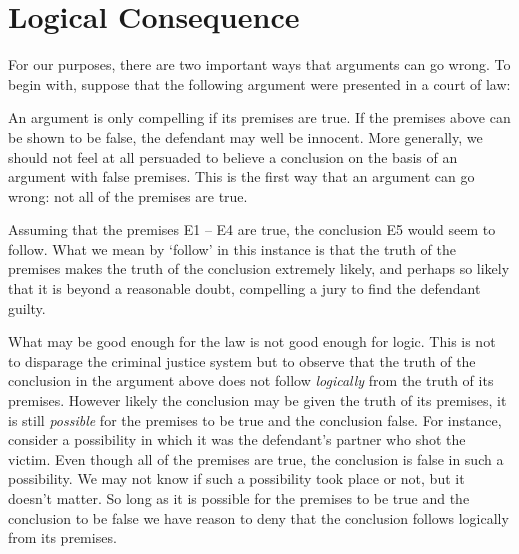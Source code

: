 




\section{Logical Consequence}
  \label{sec:LogicalConsequence}

For our purposes, there are two important ways that arguments can go wrong.
To begin with, suppose that the following argument were presented in a court of law:

\begin{earg}
\end{earg}

An argument is only compelling if its premises are true.
If the premises above can be shown to be false, the defendant may well be innocent.
More generally, we should not feel at all persuaded to believe a conclusion on the basis of an argument with false premises. 
This is the first way that an argument can go wrong: not all of the premises are true.

Assuming that the premises E1 -- E4 are true, the conclusion E5 would seem to follow.
What we mean by `follow' in this instance is that the truth of the premises makes the truth of the conclusion extremely likely, and perhaps so likely that it is beyond a reasonable doubt, compelling a jury to find the defendant guilty.

What may be good enough for the law is not good enough for logic.
This is not to disparage the criminal justice system but to observe that the truth of the conclusion in the argument above does not follow \textit{logically} from the truth of its premises.
However likely the conclusion may be given the truth of its premises, it is still \textit{possible} for the premises to be true and the conclusion false.
For instance, consider a possibility in which it was the defendant's partner who shot the victim.
Even though all of the premises are true, the conclusion is false in such a possibility.
We may not know if such a possibility took place or not, but it doesn't matter.
So long as it is possible for the premises to be true and the conclusion to be false we have reason to deny that the conclusion follows logically from its premises.

